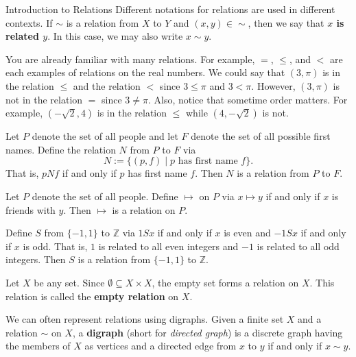 \begin{section}{Introduction to Relations}
Different notations for relations are used in different contexts.  If $\sim$ is a relation from $X$ to $Y$ and $(x,y)\in {\sim}$, then we say that \textbf{$x$ is related $y$}.  In this case, we may also write $x\sim y$.

\begin{example}
You are already familiar with many relations.  For example, $=$, $\leq$, and $<$ are each examples of relations on the real numbers. We could say that $(3,\pi)$ is in the relation $\leq$ and the relation $<$ since $3\leq \pi$ and $3<\pi$.  However, $(3,\pi)$ is not in the relation $=$ since $3\neq \pi$.  Also, notice that sometime order matters. For example, $(-\sqrt{2}, 4)$ is in the relation $\leq$ while $(4,-\sqrt{2})$ is not.
\end{example}

\begin{example}
Let $P$ denote the set of all people and let $F$ denote the set of all possible first names.  Define the relation $N$ from $P$ to $F$ via
\[
N:=\{(p,f)\mid p\text{ has first name }f\}.
\]
That is, $pNf$ if and only if $p$ has first name $f$.  Then $N$ is a relation from $P$ to $F$.
\end{example}

\begin{example}
Let $P$ denote the set of all people. Define $\mapsto$ on $P$ via $x\mapsto y$ if and only if $x$ is friends with $y$.  Then $\mapsto$ is a relation on $P$.
\end{example}

\begin{example}
Define $S$ from $\{-1,1\}$ to $\mathbb{Z}$ via $1Sx$ if and only if $x$ is even and $-1Sx$ if and only if $x$ is odd.  That is, $1$ is related to all even integers and $-1$ is related to all odd integers.  Then $S$ is a relation from $\{-1,1\}$ to $\mathbb{Z}$.
\end{example}

\begin{example}
Let $X$ be any set.  Since $\emptyset \subseteq X\times X$, the empty set forms a relation on $X$. This relation is called the \textbf{empty relation} on $X$.
\end{example}

We can often represent relations using digraphs.  Given a finite set $X$ and a relation $\sim$ on $X$, a \textbf{digraph} (short for \emph{directed graph}) is a discrete graph having the members of $X$ as vertices and a directed edge from $x$ to $y$ if and only if $x\sim y$.


\end{section}
